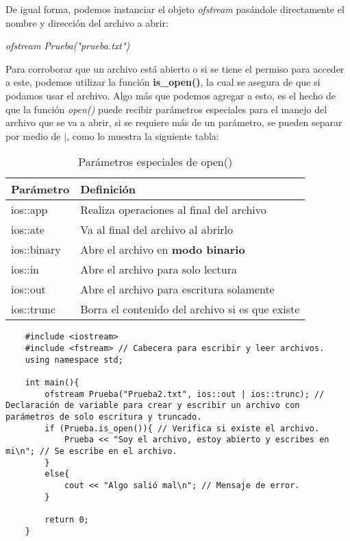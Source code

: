 De igual forma, podemos instanciar el objeto \textit{ofstream} pasándole directamente el nombre y dirección del archivo a abrir:\begin{center}\textit{ofstream Prueba("prueba.txt")}\end{center}
Para corroborar que un archivo está abierto o si se tiene el permiso para acceder a este, podemos utilizar la función \textbf{is\_open()}, la cual se asegura de que si podamos usar el archivo. Algo más que podemos agregar a esto, es el hecho de que la función \textit{open()} puede recibir parámetros especiales para el manejo del archivo que se va a abrir, si se requiere más de un parámetro, se pueden separar por medio de $|$, como lo muestra la siguiente tabla:
\begin{table}[H]
    \begin{center}
        \caption{Parámetros especiales de open()}
        \label{tab: 9}
        \begin{tabular}{l l}
            \hline
            \textbf{Parámetro}&\textbf{Definición} \\
            \hline
            ios::app    & Realiza operaciones al final del archivo \\
            ios::ate    & Va al final del archivo al abrirlo \\
            ios::binary & Abre el archivo en \textbf{modo binario} \\
            ios::in     & Abre el archivo para solo lectura \\
            ios::out    & Abre el archivo para escritura solamente \\
            ios::trunc  & Borra el contenido del archivo si es que existe \\
            \hline
        \end{tabular}
    \end{center}
\end{table}
\begin{lstlisting}
    #include <iostream>
    #include <fstream> // Cabecera para escribir y leer archivos.
    using namespace std;
    
    int main(){
        ofstream Prueba("Prueba2.txt", ios::out | ios::trunc); // Declaración de variable para crear y escribir un archivo con parámetros de solo escritura y truncado.
        if (Prueba.is_open()){ // Verifica si existe el archivo.
            Prueba << "Soy el archivo, estoy abierto y escribes en mi\n"; // Se escribe en el archivo.
        }
        else{
            cout << "Algo salió mal\n"; // Mensaje de error.
        }
        
        return 0;
    }
\end{lstlisting}

